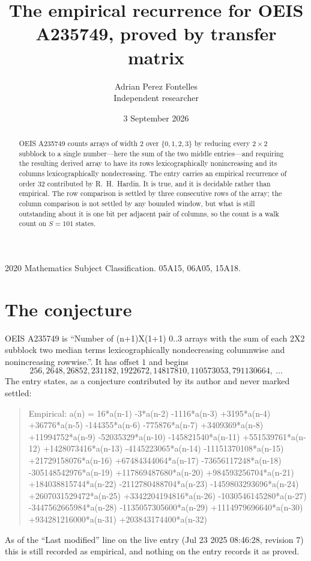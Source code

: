 \documentclass[11pt,a4paper]{article}
\title{The empirical recurrence for OEIS A235749, proved by transfer matrix}
\author{Adrian Perez Fontelles\\ \small Independent researcher}
\date{3 September 2026}
\theoremstyle{plain}
\theoremstyle{definition}
\begin{document}
\maketitle

\begin{abstract}
OEIS A235749 counts arrays of width $2$ over $\{0,1,2,3\}$ by reducing every $2\times2$ subblock to a
single number---here the sum of the two middle entries---and requiring the resulting derived array to have its rows
lexicographically nonincreasing and its columns lexicographically nondecreasing. The entry carries an
empirical recurrence of order $32$ contributed by R.~H.~Hardin. It is true, and it is
decidable rather than empirical. The row comparison is settled by three consecutive rows of the
array; the column comparison is not settled by any bounded window, but what is still outstanding
about it is one bit per adjacent pair of columns, so the count is a walk count on $S=101$
states.
\end{abstract}

\noindent\small 2020 Mathematics Subject Classification. 05A15, 06A05, 15A18.\normalsize

\section{The conjecture}

OEIS A235749 is ``Number of (n+1)X(1+1) 0..3 arrays with the sum of each 2X2 subblock two median terms lexicographically nondecreasing columnwise and nonincreasing rowwise.''. It has offset $1$ and begins
\[
256, 2648, 26852, 231182, 1922672, 14817810, 110573053, 791130664,\ \dots
\]
The entry states, as a conjecture contributed by its author and never marked settled:
\begin{quote}
Empirical: a(n) = 16*a(n-1) -3*a(n-2) -1116*a(n-3) +3195*a(n-4) +36776*a(n-5) -144355*a(n-6) -775876*a(n-7) +3409369*a(n-8) +11994752*a(n-9) -52035329*a(n-10) -145821540*a(n-11) +551539761*a(n-12) +1428073416*a(n-13) -4145223065*a(n-14) -11151370108*a(n-15) +21729158076*a(n-16) +67484344064*a(n-17) -73656117248*a(n-18) -305148542976*a(n-19) +117869487680*a(n-20) +984593256704*a(n-21) +184038815744*a(n-22) -2112780488704*a(n-23) -1459803293696*a(n-24) +2607031529472*a(n-25) +3342204194816*a(n-26) -1030546145280*a(n-27) -3447562665984*a(n-28) -1135057305600*a(n-29) +1114979696640*a(n-30) +934281216000*a(n-31) +203843174400*a(n-32)
\end{quote}
As of the ``Last modified'' line on the live entry (Jul 23 2025 08:46:28, revision 7) this is still
recorded as empirical, and nothing on the entry records it as proved.
\end{document}
